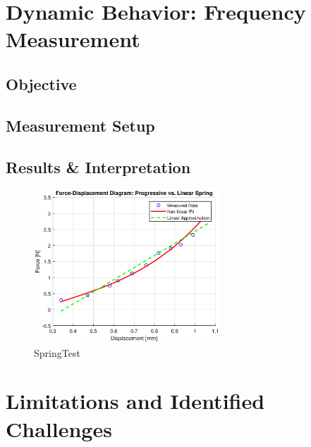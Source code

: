 \section{Dynamic Behavior: Frequency Measurement}

\subsection{Objective}

\subsection{Measurement Setup}


\subsection{Results \& Interpretation}

\begin{figure}[H]
    \centering
    \includegraphics[width=0.62\textwidth]{img/SpringTest.eps}
    \caption[SpringTest]{SpringTest}
    \label{fig:SpringTest}
\end{figure}


\section{Limitations and Identified Challenges}
